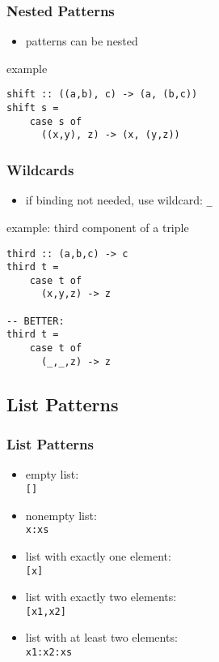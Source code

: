\documentclass[dvipsnames]{beamer}
\theoremstyle{plain}
\begin{document}
\begin{frame}[fragile]
  \frametitle{Nested Patterns}

  \begin{itemize}
    \item patterns can be nested
  \end{itemize}

  \begin{exampleblock}{example}
    \begin{lstlisting}
shift :: ((a,b), c) -> (a, (b,c))
shift s =
    case s of
      ((x,y), z) -> (x, (y,z))
    \end{lstlisting}
  \end{exampleblock}
\end{frame}

\begin{frame}[fragile]
  \frametitle{Wildcards}

  \begin{itemize}
    \item if binding not needed, use wildcard: \lstinline{_}
  \end{itemize}

  \begin{exampleblock}{example: third component of a triple}
    \begin{lstlisting}
third :: (a,b,c) -> c
third t =
    case t of
      (x,y,z) -> z

-- BETTER:
third t =
    case t of
      (_,_,z) -> z
    \end{lstlisting}
  \end{exampleblock}
\end{frame}

\subsection{List Patterns}

\begin{frame}[fragile]
  \frametitle{List Patterns}

  \begin{itemize}
    \item empty list:\\
      \lstinline{[]}
    \item nonempty list:\\
      \lstinline{x:xs}
    \item list with exactly one element:\\
      \lstinline{[x]}
    \item list with exactly two elements:\\
      \lstinline{[x1,x2]}
    \item list with at least two elements:\\
      \lstinline{x1:x2:xs}
  \end{itemize}
\end{frame}
\end{document}
